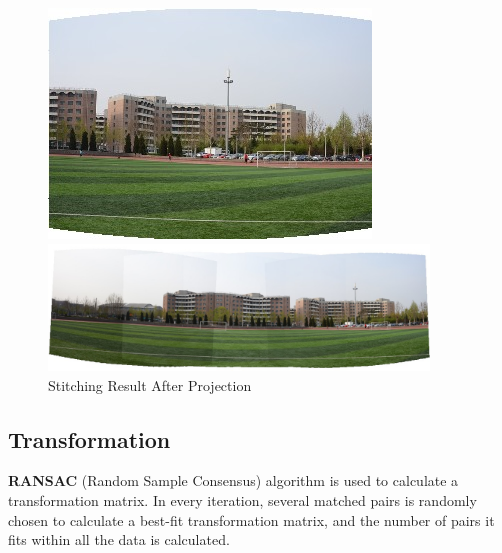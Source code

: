 \begin{enumerate}
\begin{figure}[H]
\begin{minipage}[b]{0.24\linewidth}
      \end{minipage}
      \begin{minipage}[b]{0.24\linewidth}
        \includegraphics[scale=0.3]{res/4.png}
      \end{minipage}

      \includegraphics[width=0.9\textwidth]{res/warped_stitch.png}
      \caption{Stitching Result After Projection\label{fig:cyl}}
    \end{figure}

\end{enumerate}

\subsection{Transformation}
\textbf{RANSAC} (Random Sample Consensus) algorithm\cite{ransac} is used to calculate a transformation matrix.
In every iteration, several matched pairs is randomly chosen to calculate a best-fit transformation matrix,
and the number of pairs it fits within all the data is calculated.

